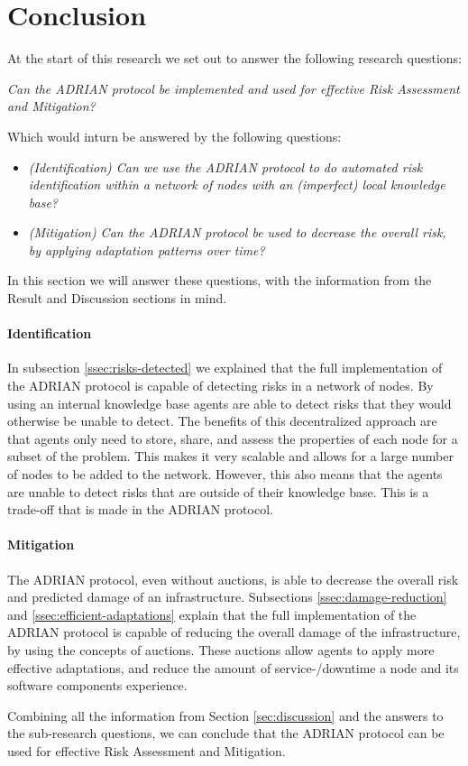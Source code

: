 \section{Conclusion}
\label{sec:conclusion}

At the start of this research we set out to answer the following research questions:

\vspace{0.5em}
\emph{Can the ADRIAN protocol be implemented and used for effective Risk Assessment and Mitigation?}
\vspace{0.5em}

Which would inturn be answered by the following questions: 
\begin{itemize}
    \item \textit{(Identification) Can we use the ADRIAN protocol to do automated risk identification within a network of nodes with an (imperfect) local knowledge base?}
    \item \textit{(Mitigation) Can the ADRIAN protocol be used to decrease the overall risk, by applying adaptation patterns over time?}
\end{itemize}

In this section we will answer these questions, with the information from the Result and Discussion sections in mind.


\paragraph*{Identification}
In subsection \ref{ssec:risks-detected} we explained that the full implementation of the ADRIAN protocol is capable of detecting risks in a network of nodes. By using an internal knowledge base agents are able to detect risks that they would otherwise be unable to detect. The benefits of this decentralized approach are that agents only need to store, share, and assess the properties of each node for a subset of the problem. This makes it very scalable and allows for a large number of nodes to be added to the network. However, this also means that the agents are unable to detect risks that are outside of their knowledge base. This is a trade-off that is made in the ADRIAN protocol. 

\paragraph*{Mitigation}
The ADRIAN protocol, even without auctions, is able to decrease the overall risk and predicted damage of an infrastructure.
Subsections \ref{ssec:damage-reduction} and \ref{ssec:efficient-adaptations} explain that the full implementation of the ADRIAN protocol is capable of reducing the overall damage of the infrastructure, by using the concepts of auctions. These auctions allow agents to apply more effective adaptations, and reduce the amount of service-/downtime a node and its software components experience. 


\vspace{0.5em}
Combining all the information from Section \ref{sec:discussion} and the answers to the sub-research questions, we can conclude that the ADRIAN protocol can be used for effective Risk Assessment and Mitigation. 
